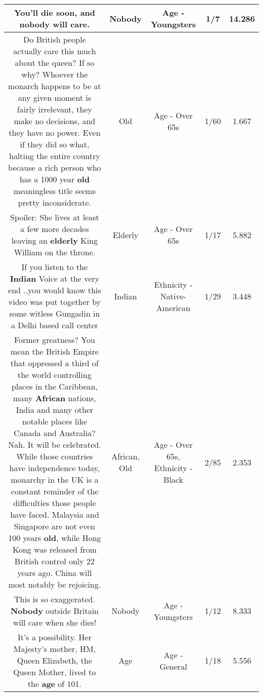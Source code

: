 \documentclass[11pt]{article}
\newlength\mylength
\begin{document}
\begin{center}
\begin{longtable}{|C{.65\mylength}|C{.30\mylength}|C{.12\mylength}|C{.12\mylength}|C{.12\mylength}|}
  \small You'll die soon, and \textbf{nobody} will care.\normalsize   & Nobody & Age - Youngsters & 1/7 & 14.286 \\  \hline
  \small Do British people actually care this much about the queen? If so why? Whoever the monarch happens to be at any given moment is fairly irrelevant, they make no decisions, and they have no power. Even if they did so what, halting the entire country because a rich person who has a 1000 year \textbf{old} meaningless title seems pretty inconsiderate.\normalsize   & Old & Age - Over 65s & 1/60 & 1.667 \\  \hline
  \small Spoiler:  She lives at least a few more decades leaving an \textbf{elderly} King William on the throne.\normalsize   & Elderly & Age - Over 65s & 1/17 & 5.882 \\  \hline
  \small If you listen to the \textbf{Indian} Voice at the very end ..you would know this video was put together by some witless Gungadin  in a Delhi based  call center\normalsize   & Indian & Ethnicity - Native-American & 1/29 & 3.448 \\  \hline
  \small Former greatness? You mean the British Empire that oppressed a third of the world controlling places in the Caribbean, many \textbf{African} nations, India and many other notable places like Canada and Australia? Nah. It will be celebrated. While those countries have independence today, monarchy in the UK is a constant reminder of the difficulties those people have faced. Malaysia and Singapore are not even 100 years \textbf{old}, while Hong Kong was released from British control only 22 years ago. China will most notably be rejoicing.\normalsize   & African, Old & Age - Over 65s, Ethnicity - Black & 2/85 & 2.353 \\  \hline
  \small This is so exaggerated. \textbf{Nobody} outside Britain will care when she dies!\normalsize   & Nobody & Age - Youngsters & 1/12 & 8.333 \\  \hline
  \small It's a possibility.  Her Majesty's mother, HM, Queen Elizabeth, the Queen Mother, lived to the \textbf{age} of 101.\normalsize   & Age & Age - General & 1/18 & 5.556 \\  \hline

\end{longtable}
\end{center}
\end{document}
